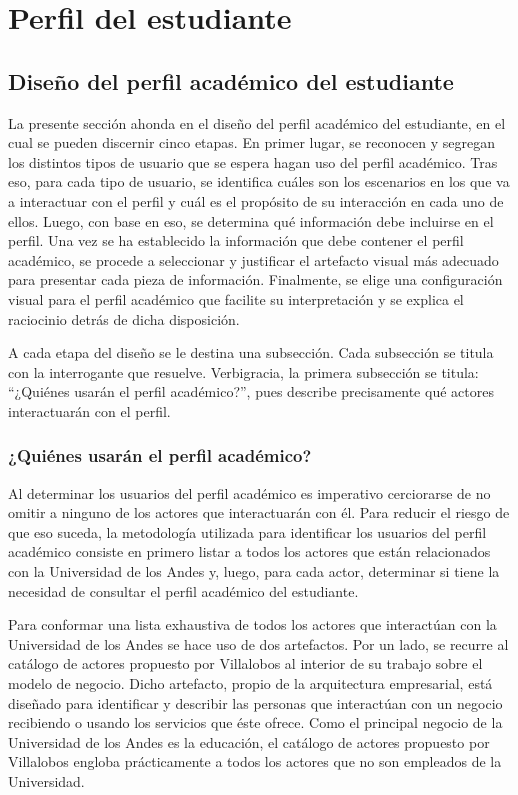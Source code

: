 \chapter{Perfil del estudiante}

\section{Diseño del perfil académico del estudiante}

La presente sección ahonda en el diseño del perfil académico del estudiante, en el cual se pueden discernir cinco etapas. En primer lugar, se reconocen y segregan los distintos tipos de usuario que se espera hagan uso del perfil académico. Tras eso, para cada tipo de usuario, se identifica cuáles son los escenarios en los que va a interactuar con el perfil y cuál es el propósito de su interacción en cada uno de ellos. Luego, con base en eso, se determina qué información debe incluirse en el perfil. Una vez se ha establecido la información que debe contener el perfil académico, se procede a seleccionar y justificar el artefacto visual más adecuado para presentar cada pieza de información. Finalmente, se elige una configuración visual para el perfil académico que facilite su interpretación y se explica el raciocinio detrás de dicha disposición.

A cada etapa del diseño se le destina una subsección. Cada subsección se titula con la interrogante que resuelve. Verbigracia, la primera subsección se titula: ``¿Quiénes usarán el perfil académico?'', pues describe precisamente qué actores interactuarán con el perfil.

\subsection{¿Quiénes usarán el perfil académico?}

Al determinar los usuarios del perfil académico es imperativo cerciorarse de no omitir a ninguno de los actores que interactuarán con él. Para reducir el riesgo de que eso suceda, la metodología utilizada para identificar los usuarios del perfil académico consiste en primero listar a todos los actores que están relacionados con la Universidad de los Andes y, luego, para cada actor, determinar si tiene la necesidad de consultar el perfil académico del estudiante.

Para conformar una lista exhaustiva de todos los actores que interactúan con la Universidad de los Andes se hace uso de dos artefactos. Por un lado, se recurre al catálogo de actores propuesto por Villalobos \cite{villalobos2021} al interior de su trabajo sobre el modelo de negocio. Dicho artefacto, propio de la arquitectura empresarial, está diseñado para identificar y describir las personas que interactúan con un negocio recibiendo o usando los servicios que éste ofrece. Como el principal negocio de la Universidad de los Andes es la educación, el catálogo de actores propuesto por Villalobos engloba prácticamente a todos los actores que no son empleados de la Universidad. 


